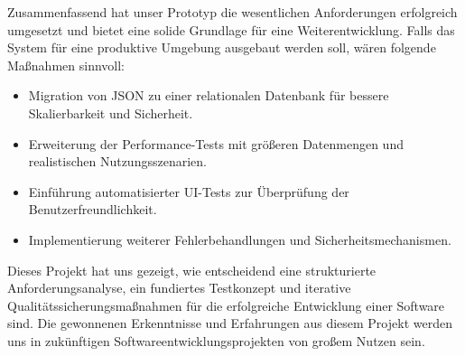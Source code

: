 Zusammenfassend hat unser Prototyp die wesentlichen Anforderungen erfolgreich umgesetzt und bietet eine solide Grundlage für eine Weiterentwicklung.
Falls das System für eine produktive Umgebung ausgebaut werden soll, wären folgende Maßnahmen sinnvoll:

\begin{itemize} 
    \item Migration von JSON zu einer relationalen Datenbank für bessere Skalierbarkeit und Sicherheit. 
    \item Erweiterung der Performance-Tests mit größeren Datenmengen und realistischen Nutzungsszenarien. 
    \item Einführung automatisierter UI-Tests zur Überprüfung der Benutzerfreundlichkeit. 
    \item Implementierung weiterer Fehlerbehandlungen und Sicherheitsmechanismen. 
\end{itemize}

Dieses Projekt hat uns gezeigt, wie entscheidend eine strukturierte Anforderungsanalyse, ein fundiertes Testkonzept und iterative Qualitätssicherungsmaßnahmen für die erfolgreiche Entwicklung einer Software sind.
Die gewonnenen Erkenntnisse und Erfahrungen aus diesem Projekt werden uns in zukünftigen Softwareentwicklungsprojekten von großem Nutzen sein.